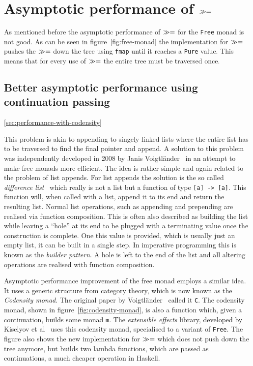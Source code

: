 \section{Asymptotic performance of $\gg=$}



As mentioned before the asymptotic performance of $\gg=$ for the
\texttt{Free} monad is not good. As can be seen in figure~\ref{fig:free-monad}
the implementation for $\gg=$ pushes the $\gg=$ down the tree using
\texttt{fmap} until it reaches a \texttt{Pure} value. This means that for every
use of $\gg=$ the entire tree must be traversed once.

\subsection{Better asymptotic performance using continuation passing}

\ref{sec:performance-with-codensity}

This problem is akin to appending to singely linked lists where the entire list
has to be traversed to find the final pointer and append. A solution to this
problem was independently developed in 2008 by Janis
Voigtländer~\cite{asymptotic-performance-improvement} in an attempt to make free
monads more efficient. The idea is rather simple and again related to the
problem of list appends. For list appends the solution is the so called
\emph{difference list}~\cite{difference-list} which really is not a list but a
function of type \texttt{[a] -> [a]}. This function will, when called with a
list, append it to its end and return the resulting list. Normal list
operations, such as appending and prepending are realised via function
composition. This is often also described as building the list while leaving a
``hole'' at its end to be plugged with a terminating value once the construction
is complete. One this value is provided, which is usually just an empty list, it
can be built in a single step. In imperative programming this is known as the
\emph{builder pattern}. A hole is left to the end of the list and all altering
operations are realised with function composition.

Asymptotic performance improvement of the free monad employs a similar idea. It
uses a generic structure from category theory, which is now known as the
\emph{Codensity monad}. The original paper by
Voigtländer~\cite{asymptotic-performance-improvement} called it \texttt{C}. The
codensity monad, shown in figure~\ref{fig:codensity-monad}, is also a function
which, given a continuation, builds some monad \texttt{m}. The \emph{extensible
  effects} library, developed by Kiselyov et al~\cite{extensible-effects} uses
this codensity monad, specialised to a variant of \texttt{Free}. The figure also
shows the new implementation for $\gg=$ which does not push down the tree
anymore, but builds two lambda functions, which are passed as continuations, a
much cheaper operation in Haskell.

